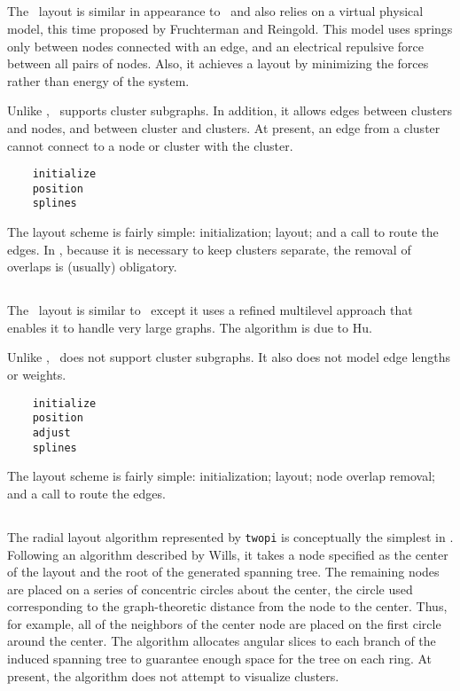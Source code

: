 \subsection{\fdp}
\label{sec:fdp}

The \fdp\ layout is similar in appearance to \neato\ and also relies
on a virtual physical model, this time proposed by Fruchterman and
Reingold\cite{fr}. This model uses springs only between nodes
connected with an edge, and an electrical repulsive force between
all pairs of nodes. Also, it achieves a layout by minimizing the forces
rather than energy of the system.

Unlike \neato, \fdp\ supports cluster subgraphs. In addition, it
allows edges between clusters and nodes, and between cluster and clusters.
At present, an edge from a cluster cannot connect to a node or cluster
with the cluster.

\begin{verbatim}
    initialize
    position
    splines
\end{verbatim}

The layout scheme is fairly simple: initialization; layout; and a call to
route the edges. In \fdp, because it is necessary
to keep clusters separate, the removal of overlaps is (usually)
obligatory.

\subsection{\sfdp}
\label{sec:sfdp}

The \sfdp\ layout is similar to \fdp\, except it uses a refined multilevel
approach that enables it to handle very large graphs. The algorithm is
due to Hu\cite{sfdp}.

Unlike \fdp, \sfdp\ does not support cluster subgraphs. It also 
does not model edge lengths or weights.

\begin{verbatim}
    initialize
    position
    adjust
    splines
\end{verbatim}

The layout scheme is fairly simple: initialization; layout; node overlap removal; and a call to
route the edges.

\subsection{\twopi}
\label{sec:twopi}

The radial layout algorithm represented by {\tt twopi} is conceptually the 
simplest in \gviz. Following an algorithm described by Wills\cite{nicheworks},
it takes a node specified as the center of the layout and the root
of the generated spanning tree. The remaining
nodes are placed on a series of concentric circles about the center,
the circle used corresponding to the graph-theoretic distance from the
node to the center. Thus, for example, all of the neighbors of the
center node are placed on the first circle around the center.
The algorithm allocates angular slices to each branch of the 
induced spanning tree to guarantee enough space for the tree on each ring.
At present, the algorithm does not attempt to visualize clusters.

